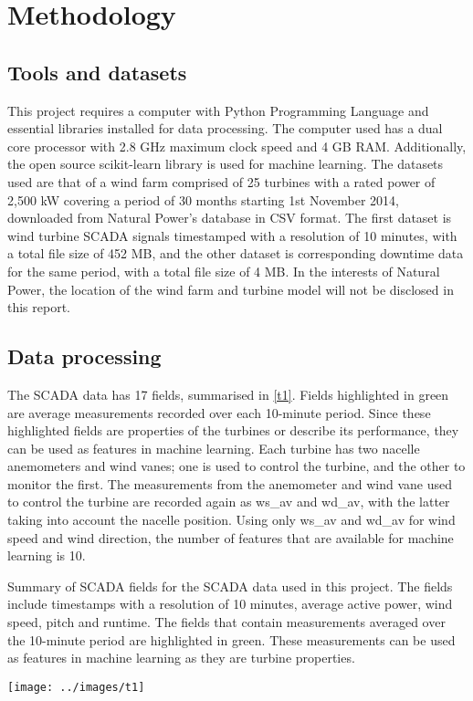 \chapter{Methodology}\label{c2}

\section{Tools and datasets}

This project requires a computer with Python Programming Language \cite{Welco}
and essential libraries installed for data processing. The computer used has a
dual core processor with 2.8 GHz maximum clock speed and 4 GB RAM.
Additionally, the open source scikit-learn library \cite{Pedre11} is used for
machine learning. The datasets used are that of a wind farm comprised of 25
turbines with a rated power of 2,500 kW covering a period of 30 months
starting 1st November 2014, downloaded from Natural Power's database in CSV
format. The first dataset is wind turbine SCADA signals timestamped with a
resolution of 10 minutes, with a total file size of 452 MB, and the other
dataset is corresponding downtime data for the same period, with a total file
size of 4 MB. In the interests of Natural Power, the location of the wind farm
and turbine model will not be disclosed in this report.

\section{Data processing}

The SCADA data has 17 fields, summarised in \autoref{t1}. Fields highlighted
in green are average measurements recorded over each 10-minute period. Since
these highlighted fields are properties of the turbines or describe its
performance, they can be used as features in machine learning. Each turbine
has two nacelle anemometers and wind vanes; one is used to control the
turbine, and the other to monitor the first. The measurements from the
anemometer and wind vane used to control the turbine are recorded again as
ws\_av and wd\_av, with the latter taking into account the nacelle position.
Using only ws\_av and wd\_av for wind speed and wind direction, the number of
features that are available for machine learning is 10.

\begin{table}
  \centering
  \caption{\label{t1}Summary of SCADA fields for the SCADA data used in this
  project. The fields include timestamps with a resolution of 10 minutes,
  average active power, wind speed, pitch and runtime. The fields that contain
  measurements averaged over the 10-minute period are highlighted in green.
  These measurements can be used as features in machine learning as they are
  turbine properties.}
  \texttt{[image: ../images/t1]}
\end{table}

